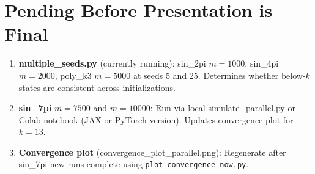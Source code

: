 \documentclass[11pt, letterpaper]{article}
\begin{document}
\section*{Pending Before Presentation is Final}

\begin{enumerate}[leftmargin=1.4em, itemsep=2pt]
  \item \textbf{multiple\_seeds.py} (currently running): sin\_2pi $m=1000$, sin\_4pi
        $m=2000$, poly\_k3 $m=5000$ at seeds 5 and 25. Determines whether below-$k$ states
        are consistent across initializations.
  \item \textbf{sin\_7pi} $m=7500$ and $m=10000$: Run via local simulate\_parallel.py
        or Colab notebook (JAX or PyTorch version). Updates convergence plot for $k=13$.
  \item \textbf{Convergence plot} (convergence\_plot\_parallel.png): Regenerate after
        sin\_7pi new runs complete using \texttt{plot\_convergence\_now.py}.
\end{enumerate}
\end{document}
